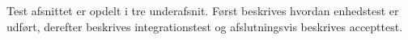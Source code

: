 
Test afsnittet er opdelt i tre underafsnit. 
Først beskrives hvordan enhedstest er udført, derefter beskrives integrationstest og afslutningsvis beskrives accepttest. 











